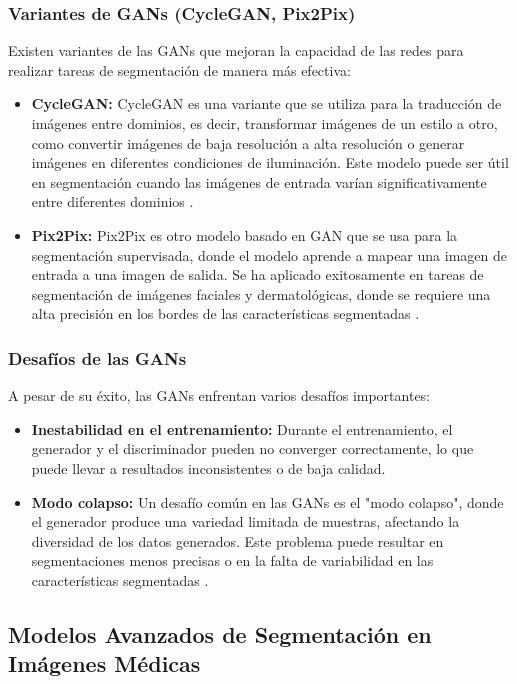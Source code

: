 \subsubsection{Variantes de GANs (CycleGAN, Pix2Pix)}  
Existen variantes de las GANs que mejoran la capacidad de las redes para realizar tareas de segmentación de manera más efectiva:
\begin{itemize}
    \item \textbf{CycleGAN:} CycleGAN es una variante que se utiliza para la traducción de imágenes entre dominios, es decir, transformar imágenes de un estilo a otro, como convertir imágenes de baja resolución a alta resolución o generar imágenes en diferentes condiciones de iluminación. Este modelo puede ser útil en segmentación cuando las imágenes de entrada varían significativamente entre diferentes dominios \parencite{autor2019cyclegan}.
    \item \textbf{Pix2Pix:} Pix2Pix es otro modelo basado en GAN que se usa para la segmentación supervisada, donde el modelo aprende a mapear una imagen de entrada a una imagen de salida. Se ha aplicado exitosamente en tareas de segmentación de imágenes faciales y dermatológicas, donde se requiere una alta precisión en los bordes de las características segmentadas \parencite{autor2019pix2pix}.
\end{itemize}

\subsubsection{Desafíos de las GANs}  
A pesar de su éxito, las GANs enfrentan varios desafíos importantes:
\begin{itemize}
    \item \textbf{Inestabilidad en el entrenamiento:} Durante el entrenamiento, el generador y el discriminador pueden no converger correctamente, lo que puede llevar a resultados inconsistentes o de baja calidad.
    \item \textbf{Modo colapso:} Un desafío común en las GANs es el "modo colapso", donde el generador produce una variedad limitada de muestras, afectando la diversidad de los datos generados. Este problema puede resultar en segmentaciones menos precisas o en la falta de variabilidad en las características segmentadas \parencite{autor2022challenges_gans}.
\end{itemize}

\subsection{Modelos Avanzados de Segmentación en Imágenes Médicas}
%
